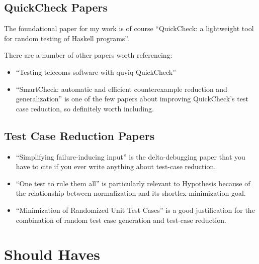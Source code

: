 \subsection{QuickCheck Papers}

The foundational paper for my work is of course ``QuickCheck: a lightweight tool for random testing of Haskell programs''\cite{DBLP:conf/icfp/ClaessenH00}.

There are a number of other papers worth referencing:

\begin{itemize}
\item ``Testing telecoms software with quviq QuickCheck''\cite{DBLP:conf/erlang/ArtsHJW06}
\item ``SmartCheck: automatic and efficient counterexample reduction and generalization''\cite{DBLP:conf/haskell/Pike14} is one of the few papers about improving QuickCheck's test case reduction,
so definitely worth including.
\end{itemize}

\subsection{Test Case Reduction Papers}

\begin{itemize}
\item ``Simplifying failure-inducing input''\cite{DBLP:conf/issta/HildebrandtZ00} is the delta-debugging paper that you have to cite if you ever write anything about test-case reduction.
\item ``One test to rule them all''\cite{DBLP:conf/issta/GroceHK17} is particularly relevant to Hypothesis because of the relationship between normalization and its shortlex-minimization goal.
\item ``Minimization of Randomized Unit Test Cases''\cite{DBLP:conf/issre/LeiA05} is a good justification for the combination of random test case generation and test-case reduction.
\end{itemize}


\section{Should Haves}

